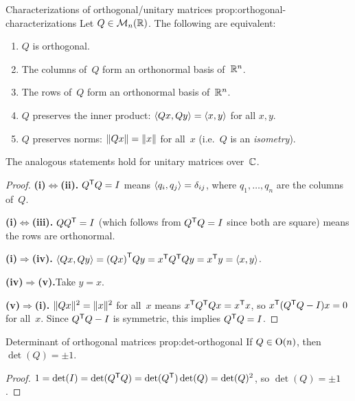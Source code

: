 \begin{proposition}{Characterizations of orthogonal/unitary matrices}%
{prop:orthogonal-characterizations}
Let $Q\in\mathcal{M}_n({\mathbb{R}})$.  The following are equivalent:
\begin{enumerate}[label=(\roman*)]
  \item $Q$ is orthogonal.
  \item The columns of~$Q$ form an orthonormal basis of~${\mathbb{R}}^n$.
  \item The rows of~$Q$ form an orthonormal basis of~${\mathbb{R}}^n$.
  \item $Q$ preserves the inner product:
    $\langle Qx,Qy\rangle = \langle x,y\rangle$ for all $x,y$.
  \item $Q$ preserves norms: $\lVert Qx\rVert = \lVert x\rVert$ for all~$x$
    (i.e.\ $Q$ is an \emph{isometry}).
\end{enumerate}
The analogous statements hold for unitary matrices over~${\mathbb{C}}$.
\end{proposition}

\begin{proof}
\textbf{(i)$\Leftrightarrow$(ii).}\quad
${Q}^{\mathsf{T}}Q = I$ means $\langle q_i,q_j\rangle = \delta_{ij}$, where
$q_1,\ldots,q_n$ are the columns of~$Q$.

\textbf{(i)$\Leftrightarrow$(iii).}\quad
$Q{Q}^{\mathsf{T}} = I$ (which follows from ${Q}^{\mathsf{T}}Q = I$ since
both are square) means the rows are orthonormal.

\textbf{(i)$\Rightarrow$(iv).}\quad
$\langle Qx,Qy\rangle = {(Qx)}^{\mathsf{T}}Qy = {x}^{\mathsf{T}}{Q}^{\mathsf{T}}Qy
= {x}^{\mathsf{T}}y = \langle x,y\rangle$.

\textbf{(iv)$\Rightarrow$(v).}\quad Take $y = x$.

\textbf{(v)$\Rightarrow$(i).}\quad
$\lVert Qx\rVert^2 = \lVert x\rVert^2$ for all~$x$ means
${x}^{\mathsf{T}}{Q}^{\mathsf{T}}Qx = {x}^{\mathsf{T}}x$, so
${x}^{\mathsf{T}}({Q}^{\mathsf{T}}Q - I)x = 0$ for all~$x$.  Since
${Q}^{\mathsf{T}}Q - I$ is symmetric, this implies
${Q}^{\mathsf{T}}Q = I$.
\end{proof}

\begin{proposition}{Determinant of orthogonal matrices}%
{prop:det-orthogonal}
If $Q\in\operatorname{O}(n)$, then $\det(Q) = \pm 1$.
\end{proposition}

\begin{proof}
$1 = \det(I) = \det({Q}^{\mathsf{T}}Q) = \det({Q}^{\mathsf{T}})\det(Q) =
\det(Q)^2$, so $\det(Q) = \pm 1$.
\end{proof}

